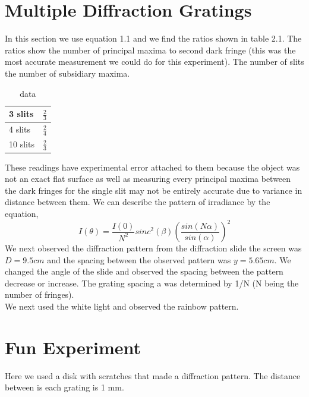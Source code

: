 \documentclass[paper=a4, fontsize=11pt]{scrartcl} %
\numberwithin{equation}{section} %
\numberwithin{figure}{section} %
\numberwithin{table}{section} %
\begin{document}
\section{Multiple Diffraction Gratings}
In this section we use equation 1.1 and we find the ratios shown in table 2.1. The ratios show the number of principal maxima to second dark fringe (this was the most accurate measurement we could do for this experiment). The number of slits the number of subsidiary maxima.
\begin{table}[H]
  \centering 
   \caption{data}
  \begin{tabular}{|l |r| }
    \hline
     3 slits & $\frac{2}{3}$ \\ \hline
     4 slits & $\frac{2}{4}$ \\ \hline
     10 slits & $\frac{2}{3}$ \\  \hline
  \end{tabular}
\end{table}
These readings have experimental error attached to them because the object was not an exact flat surface as well as measuring every principal maxima between the dark fringes for the single slit may not be entirely accurate due to variance in distance between them. We can describe the pattern of irradiance by the equation,
\begin{equation}
I(\theta) = \frac{I(0)}{N^2} sinc^2(\beta) \left(\frac{sin(N\alpha)}{sin(\alpha)}\right)^2
\end{equation}
We next observed the diffraction pattern from the diffraction slide the screen was $D = 9.5 cm $ and the spacing between the observed pattern was $y =  5.65 cm$. We changed the angle of the slide and observed the spacing between the pattern decrease or increase.  The grating spacing a was determined by 1/N  (N being the number of fringes). \\

We next used the white light and observed the rainbow pattern. 
\section{Fun Experiment}
Here we used a disk with scratches that made a diffraction pattern. The distance between is each grating is 1 mm. 
\end{document}
